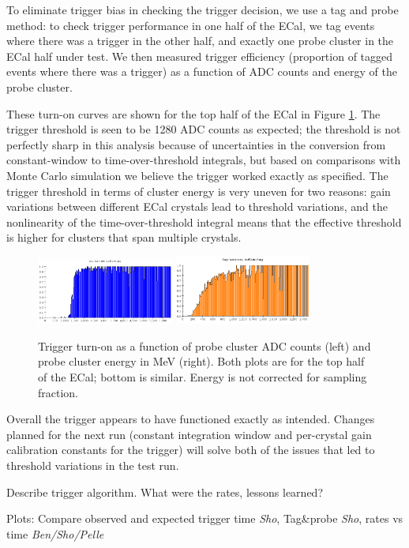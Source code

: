 To eliminate trigger bias in checking the trigger decision, we use a tag and probe method: to check trigger performance in one half of the ECal, we tag events where there was a trigger in the other half, and exactly one probe cluster in the ECal half under test. 
We then measured trigger efficiency (proportion of tagged events where there was a trigger) as a function of ADC counts and energy of the probe cluster.

These turn-on curves are shown for the top half of the ECal in Figure \ref{fig:turnon}. 
The trigger threshold is seen to be 1280 ADC counts as expected; the threshold is not perfectly sharp in this analysis because of uncertainties in the conversion from constant-window to time-over-threshold integrals, but based on comparisons with Monte Carlo simulation we believe the trigger worked exactly as specified. 
The trigger threshold in terms of cluster energy is very uneven for two reasons: gain variations between different ECal crystals lead to threshold variations, and the nonlinearity of the time-over-threshold integral means that the effective threshold is higher for clusters that span multiple crystals.

\begin{figure}[ht]
	\includegraphics[width=0.4\textwidth]{test2012/ecalperformance/top_turnon_adc}
	\includegraphics[width=0.4\textwidth]{test2012/ecalperformance/top_turnon_e}
	\caption{\small{Trigger turn-on as a function of probe cluster ADC counts (left) and probe cluster energy in MeV (right). Both plots are for the top half of the ECal; bottom is similar. 
	Energy is not corrected for sampling fraction.}}
	\label{fig:turnon}
\end{figure}

Overall the trigger appears to have functioned exactly as intended. Changes planned for the next run (constant integration window and per-crystal gain calibration constants for the trigger) will solve both of the issues that led to threshold variations in the test run.

{\color{red} Describe trigger algorithm.} What were the rates, lessons learned?

Plots: Compare observed and expected trigger time {\it Sho}, Tag\&probe {\it Sho}, rates vs time {\it Ben/Sho/Pelle}


